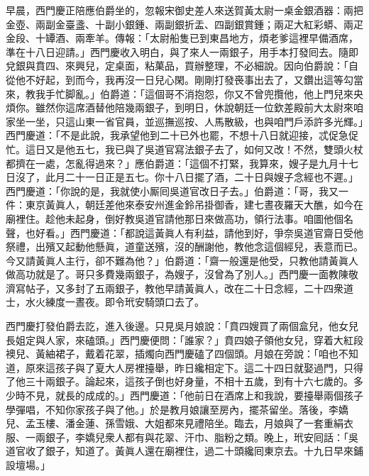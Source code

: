 早晨，西門慶正陪應伯爵坐的，忽報宋御史差人來送賀黃太尉一桌金銀酒器：兩把金壺、兩副金臺盞、十副小銀鍾、兩副銀折盂、四副銀賞鍾；兩疋大紅彩蟒、兩疋金段、十罈酒、兩牽羊。傳報：「太尉船隻已到東昌地方，煩老爹這裡早備酒席，準在十八日迎請。」西門慶收入明白，與了來人一兩銀子，用手本打發囘去。隨即兌銀與賁四、來興兒，定桌面，粘菓品，買辦整理，不必細說。因向伯爵說：「自從他不好起，到而今，我再沒一日兒心閑。剛剛打發䘮事出去了，又鑽出這等勾當來，教我手忙脚亂。」{}伯爵道：「這個哥不消抱怨，你又不曾兜攬他，他上門兒來央煩你。雖然你這席酒替他陪幾兩銀子，到明日，休說朝廷一位欽差殿前大太尉來咱家坐一坐，只這山東一省官員，並巡撫巡按、人馬散級，也與咱門戶添許多光輝。」{}西門慶道：「不是此說，我承望他到二十已外也罷，不想十八日就迎接，忒促急促忙。這日又是他五七，我已與了吳道官寫法銀子去了，如何又改！不然，雙頭火杖都擠在一處，怎亂得過來？」應伯爵道：「這個不打緊，我算來，嫂子是九月十七日沒了，此月二十一日正是五七。你十八日擺了酒，二十日與嫂子念經也不遲。」西門慶道：「你說的是，我就使小厮囘吳道官改日子去。」伯爵道：「哥，我又一件：東京黃眞人，朝廷差他來泰安州進金鈴吊掛御香，建七晝夜羅天大醮，如今在廟裡住。趁他未起身，倒好教吳道官請他那日來做高功，領行法事。咱圖他個名聲，也好看。」{}西門慶道：「都說這黃眞人有利益，{}請他到好，爭奈吳道官齋日受他祭禮，出殯又起動他懸眞，道童送殯，沒的酬謝他，教他念這個經兒，表意而已。今又請黃眞人主行，卻不難為他？」伯爵道：「齋一般還是他受，只教他請黃眞人做高功就是了。哥只多費幾兩銀子，為嫂子，沒曾為了別人。」{}西門慶一面教陳敬濟寫帖子，又多封了五兩銀子，教他早請黃眞人，改在二十日念經，二十四衆道士，水火練度一晝夜。即令玳安騎頭口去了。

西門慶打發伯爵去訖，進入後邊。只見吳月娘說：「賁四嫂買了兩個盒兒，他女兒長姐定與人家，來磕頭。」西門慶便問：「誰家？」賁四娘子領他女兒，穿着大紅段襖兒、黃紬裙子，戴着花翠，插燭向西門慶磕了四個頭。月娘在旁說：「咱也不知道，原來這孩子與了夏大人房裡擡舉，昨日纔相定下。{}這二十四日就娶過門，只得了他三十兩銀子。論起來，這孩子倒也好身量，不相十五歲，到有十六七歲的。多少時不見，就長的成成的。」西門慶道：「他前日在酒席上和我說，要擡舉兩個孩子學彈唱，不知你家孩子與了他。」於是教月娘讓至房內，擺茶留坐。落後，李嬌兒、孟玉樓、潘金蓮、孫雪娥、大姐都來見禮陪坐。臨去，月娘與了一套重絹衣服、一兩銀子，李嬌兒衆人都有與花翠、汗巾、脂粉之類。晚上，玳安囘話：「吳道官收了銀子，知道了。黃眞人還在廟裡住，過二十頭纔囘東京去。十九日早來鋪設壇場。」

